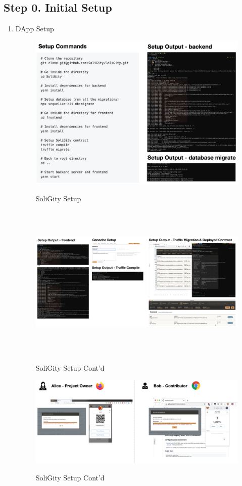 \documentclass[12pt]{article}
\renewcommand{\_}{\kern-1.5pt\textunderscore\kern-1.5pt}
\begin{document}
\subsection*{Step 0. Initial Setup}
 \begin{enumerate}
   \item DApp Setup
       \begin{figure}[H]
    	\centering
        \includegraphics[height=7.5cm]{graphs/46. setup_1.png}\\
    	\caption{SoliGity Setup}
    	\label{fig:setup1}
        \end{figure}
    
        \begin{figure}[H]
        	\centering
            \includegraphics[height=7.5cm]{graphs/47. setup_2.png}\\
        	\caption{SoliGity Setup Cont'd}
        	\label{fig:setup2}
        \end{figure}

        \begin{figure}[H]
        	\centering
            \includegraphics[width=16.5cm]{graphs/48. setup_3.png}\\
        	\caption{SoliGity Setup Cont'd}
        	\label{fig:setup3}
        \end{figure}


\end{enumerate}
\end{document}
